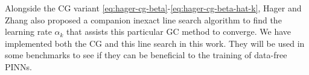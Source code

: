 Alongside the CG variant \eqref{eq:hager-cg-beta}-\eqref{eq:hager-cg-beta-hat-k}, Hager and Zhang also proposed a companion inexact line search algorithm to find the learning rate $\alpha_k$ that assists this particular GC method to converge.
We have implemented both the CG and this line search in this work.
They will be used in some benchmarks to see if they can be beneficial to the training of data-free PINNs.

